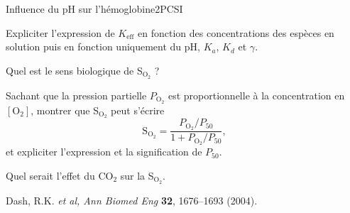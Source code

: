 \begin{exercise}{Influence du pH sur l'hémoglobine}{2}{PCSI}
\begin{questions}

\question Expliciter l'expression de $K_\text{eff}$ en fonction des concentrations des espèces en solution puis en fonction uniquement du pH, $K_a$, $K_d$ et $\gamma$.


\question Quel est le sens biologique de S$_{\text{O}_2}$ ?

\question Sachant que la pression partielle $P_{\text{O}_2}$ est proportionnelle à la concentration en $[\text{O}_2]$, montrer que S$_{\text{O}_2}$ peut s'écrire
$$\text{S}_{\text{O}_2} = \dfrac{P_{\text{O}_2}/P_{50}}{1 + P_{\text{O}_2}/P_{50}},$$
et expliciter l'expression et la signification de $P_{50}$.

\question Quel serait l'effet du CO$_2$ sur la S$_{\text{O}_2}$.

\end{questions}

\plusloin
Dash, R.K. \emph{et al, Ann Biomed Eng} \textbf{32}, 1676--1693 (2004).

\end{exercise}

